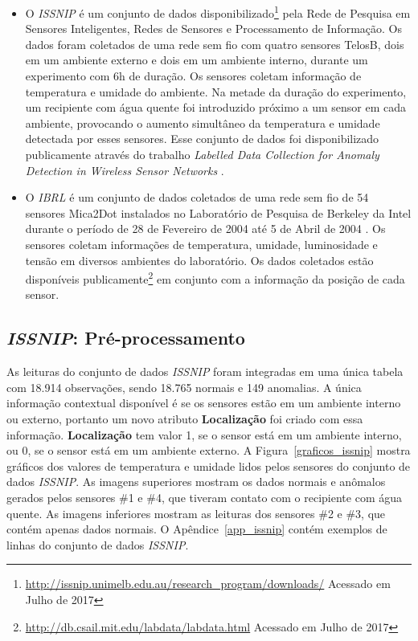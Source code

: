 \documentclass[cic,tc]{iiufrgs}
\begin{document}
\begin{itemize}
    \item O \textit{ISSNIP} é um conjunto de dados disponibilizado\footnote{\url{http://issnip.unimelb.edu.au/research\_program/downloads/} Acessado em Julho de 2017} pela Rede de Pesquisa em Sensores Inteligentes, Redes de Sensores e Processamento de Informação. Os dados foram coletados de uma rede sem fio com quatro sensores TelosB, dois em um ambiente externo e dois em um ambiente interno, durante um experimento com 6h de duração. Os sensores coletam informação de temperatura e umidade do ambiente. Na metade da duração do experimento, um recipiente com água quente foi introduzido próximo a um sensor em cada ambiente, provocando o aumento simultâneo da temperatura e umidade detectada por esses sensores. Esse conjunto de dados foi disponibilizado publicamente através do trabalho \textit{Labelled Data Collection for Anomaly Detection in Wireless Sensor Networks} \cite{labelled2010}.
    \item O \textit{IBRL} é um conjunto de dados coletados de uma rede sem fio de 54 sensores Mica2Dot instalados no Laboratório de Pesquisa de Berkeley da Intel durante o período de 28 de Fevereiro de 2004 até 5 de Abril de 2004 \cite{ibrl}. Os sensores coletam informações de temperatura, umidade, luminosidade e tensão em diversos ambientes do laboratório. Os dados coletados estão disponíveis publicamente\footnote{\url{http://db.csail.mit.edu/labdata/labdata.html} Acessado em Julho de 2017} em conjunto com a informação da posição de cada sensor.
\end{itemize}

\subsection{\textit{ISSNIP}: Pré-processamento}

As leituras do conjunto de dados \textit{ISSNIP} foram integradas em uma única tabela com 18.914 observações, sendo 18.765 normais e 149 anomalias. A única informação contextual disponível é se os sensores estão em um ambiente interno ou externo, portanto um novo atributo \textbf{Localização} foi criado com essa informação. \textbf{Localização} tem valor 1, se o sensor está em um ambiente interno, ou 0, se o sensor está em um ambiente externo. A Figura~\ref{graficos_issnip} mostra gráficos dos valores de temperatura e umidade lidos pelos sensores do conjunto de dados \textit{ISSNIP}. As imagens superiores mostram os dados normais e anômalos gerados pelos sensores \#1 e \#4, que tiveram contato com o recipiente com água quente. As imagens inferiores mostram as leituras dos sensores \#2 e \#3, que contém apenas dados normais. O Apêndice~\ref{app_issnip} contém exemplos de linhas do conjunto de dados \textit{ISSNIP}.
\end{document}
